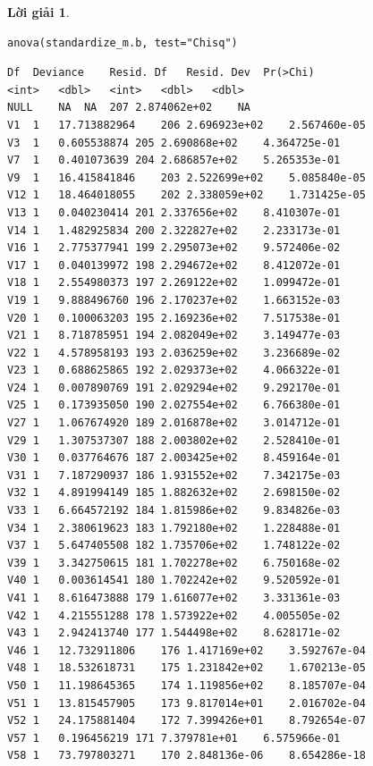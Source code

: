 \documentclass[14pt, a4paper]{article}
\theoremstyle{sltheorem}
\theoremstyle{soltheorem}
\newtheorem*{loigiai}{Lời giải}
\begin{document}
\begin{loigiai}
    \begin{verbatim}
anova(standardize_m.b, test="Chisq")
    \end{verbatim}

    \begin{verbatim}
Df	Deviance	Resid. Df	Resid. Dev	Pr(>Chi)
<int>	<dbl>	<int>	<dbl>	<dbl>
NULL	NA	NA	207	2.874062e+02	NA
V1	1	17.713882964	206	2.696923e+02	2.567460e-05
V3	1	0.605538874	205	2.690868e+02	4.364725e-01
V7	1	0.401073639	204	2.686857e+02	5.265353e-01
V9	1	16.415841846	203	2.522699e+02	5.085840e-05
V12	1	18.464018055	202	2.338059e+02	1.731425e-05
V13	1	0.040230414	201	2.337656e+02	8.410307e-01
V14	1	1.482925834	200	2.322827e+02	2.233173e-01
V16	1	2.775377941	199	2.295073e+02	9.572406e-02
V17	1	0.040139972	198	2.294672e+02	8.412072e-01
V18	1	2.554980373	197	2.269122e+02	1.099472e-01
V19	1	9.888496760	196	2.170237e+02	1.663152e-03
V20	1	0.100063203	195	2.169236e+02	7.517538e-01
V21	1	8.718785951	194	2.082049e+02	3.149477e-03
V22	1	4.578958193	193	2.036259e+02	3.236689e-02
V23	1	0.688625865	192	2.029373e+02	4.066322e-01
V24	1	0.007890769	191	2.029294e+02	9.292170e-01
V25	1	0.173935050	190	2.027554e+02	6.766380e-01
V27	1	1.067674920	189	2.016878e+02	3.014712e-01
V29	1	1.307537307	188	2.003802e+02	2.528410e-01
V30	1	0.037764676	187	2.003425e+02	8.459164e-01
V31	1	7.187290937	186	1.931552e+02	7.342175e-03
V32	1	4.891994149	185	1.882632e+02	2.698150e-02
V33	1	6.664572192	184	1.815986e+02	9.834826e-03
V34	1	2.380619623	183	1.792180e+02	1.228488e-01
V37	1	5.647405508	182	1.735706e+02	1.748122e-02
V39	1	3.342750615	181	1.702278e+02	6.750168e-02
V40	1	0.003614541	180	1.702242e+02	9.520592e-01
V41	1	8.616473888	179	1.616077e+02	3.331361e-03
V42	1	4.215551288	178	1.573922e+02	4.005505e-02
V43	1	2.942413740	177	1.544498e+02	8.628171e-02
V46	1	12.732911806	176	1.417169e+02	3.592767e-04
V48	1	18.532618731	175	1.231842e+02	1.670213e-05
V50	1	11.198645365	174	1.119856e+02	8.185707e-04
V51	1	13.815457905	173	9.817014e+01	2.016702e-04
V52	1	24.175881404	172	7.399426e+01	8.792654e-07
V57	1	0.196456219	171	7.379781e+01	6.575966e-01
V58	1	73.797803271	170	2.848136e-06	8.654286e-18
        
    \end{verbatim}


\end{loigiai}
\end{document}

